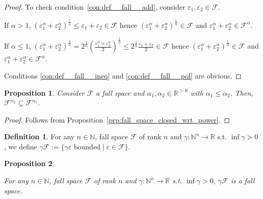\documentclass{article}
\numberwithin{equation}{section}
\theoremstyle{definition}
\newtheorem{definition}{Definition}[section]
\theoremstyle{plain}
\newtheorem{proposition}{Proposition}[section]
\newcommand{\Nats}{\mathbb{N}}
\newcommand{\Reals}{\mathbb{R}}
\newcommand{\NatFun}{\Nats^n \rightarrow}
\newcommand{\Fall}{\mathcal{F}}
\begin{document}
\begin{proof}

To check condition~\ref{con:def__fall__add}, consider $\varepsilon_1, \varepsilon_2 \in \Fall$. 

If $\alpha > 1$, $(\varepsilon_1^\alpha + \varepsilon_2^\alpha)^\frac{1}{\alpha} \leq \varepsilon_1 + \varepsilon_2 \in \Fall$ hence $(\varepsilon_1^\alpha + \varepsilon_2^\alpha)^\frac{1}{\alpha} \in \Fall$ and $\varepsilon_1^\alpha + \varepsilon_2^\alpha \in \Fall^\alpha$.

If $\alpha \leq 1$, $(\varepsilon_1^\alpha + \varepsilon_2^\alpha)^\frac{1}{\alpha} = 2^\frac{1}{\alpha}(\frac{\varepsilon_1^\alpha + \varepsilon_2^\alpha}{2})^\frac{1}{\alpha} \leq 2^\frac{1}{\alpha} \frac{\varepsilon_1+\varepsilon_2}{2} \in \Fall$ hence $(\varepsilon_1^\alpha + \varepsilon_2^\alpha)^\frac{1}{\alpha} \in \Fall$ and $\varepsilon_1^\alpha + \varepsilon_2^\alpha \in \Fall^\alpha$.

Conditions \ref{con:def__fall__ineq} and \ref{con:def__fall__pol} are obvious.
\end{proof}

\begin{proposition}

Consider $\Fall$ a fall space and $\alpha_1,\alpha_2 \in \Reals^{>0}$ with $\alpha_1 \leq \alpha_2$. Then, ${\Fall^{\alpha_2} \subseteq \Fall^{\alpha_1}}$.

\end{proposition}

\begin{proof}

Follows from Proposition~\ref{prp:fall_space_closed_wrt_power}.
\end{proof}

\begin{samepage}
\begin{definition}

For any $n \in \Nats$, fall space $\Fall$ of rank $n$ and $\gamma: \NatFun \Reals$ s.t. $\inf \gamma > 0$, we define $\gamma \Fall := \{\gamma \varepsilon \text{ bounded} \mid \varepsilon \in \Fall\}$.

\end{definition}
\end{samepage}

\begin{samepage}
\begin{proposition}
\label{prp:tbd}

For any $n \in \Nats$, fall space $\Fall$ of rank $n$ and $\gamma: \NatFun \Reals$ s.t. $\inf \gamma > 0$, $\gamma \Fall$ is a fall space.

\end{proposition}
\end{samepage}
\end{document}
